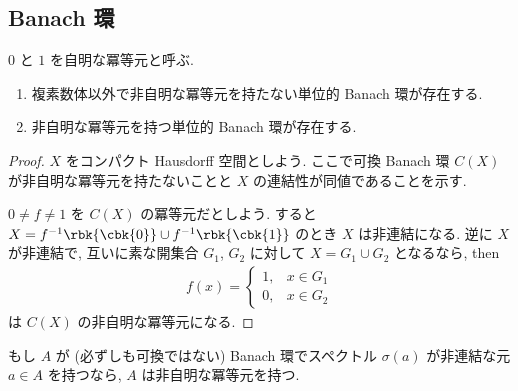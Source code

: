 \documentclass[openany, a4paper, oneside]{jsbook}
\begin{document}
\subsection{Banach 環}

\begin{ex}\label{counterexamples-analysis-moslehian1}
$0$ と $1$ を自明な冪等元と呼ぶ.
\begin{enumerate}
\item 複素数体以外で非自明な冪等元を持たない単位的 Banach 環が存在する.
\item 非自明な冪等元を持つ単位的 Banach 環が存在する.
\end{enumerate}
\end{ex}
\begin{proof}
$X$ をコンパクト Hausdorff 空間としよう.
ここで可換 Banach 環 $C(X)$ が非自明な冪等元を持たないことと $X$ の連結性が同値であることを示す.

$0 \neq f \neq 1$ を $C(X)$ の冪等元だとしよう.
すると $X = f^{-1} \rbk{\cbk{0}} \cup f^{-1} \rbk{\cbk{1}}$ のとき $X$ は非連結になる.
逆に $X$ が非連結で, 互いに素な開集合 $G_1$, $G_2$ に対して $X = G_1 \cup G_2$ となるなら,
then
\begin{align}
 f(x)
 =
 \begin{cases}
  1, & x \in G_1 \\
  0, & x \in G_2
 \end{cases}
\end{align}
は $C(X)$ の非自明な冪等元になる.
\end{proof}
\begin{rem}
もし $A$ が (必ずしも可換ではない) Banach 環でスペクトル
$\sigma (a)$ が非連結な元 $a \in A$ を持つなら,
$A$ は非自明な冪等元を持つ.
\end{rem}
\end{document}
